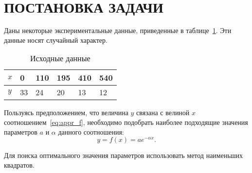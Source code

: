 \section{ПОСТАНОВКА ЗАДАЧИ}

Даны некоторые экспериментальные данные, приведенные в таблице~\ref{tbl:source_data}.
Эти данные носят случайный характер.

\begin{table}[h!]
  \caption{Исходные данные}
  \label{tbl:source_data}
  \small{
    \centering
    \begin{tabular}{| p{} | p{} | p{} | p{} | p{} | p{} |}
      \hline

      $x$ & 0 & 110 & 195 & 410 & 540 \\ \hline
      $y$ & 33 & 24 & 20 & 13 & 12 \\

      \hline
    \end{tabular}
  }
\end{table}

Пользуясь предположением, что величина $ y $ связана с велиной $ x $ соотношением~\ref{eq:appr_f},
необходимо подобрать наиболее подходящие значения параметров $ a $ и $\alpha $ данного соотношения:
\begin{equation}
\label{eq:appr_f}
  y = f(x) = ae^{-\alpha x}.
\end{equation}

Для поиска оптимального значения параметров использовать метод наименьших квадратов.

\newpage
